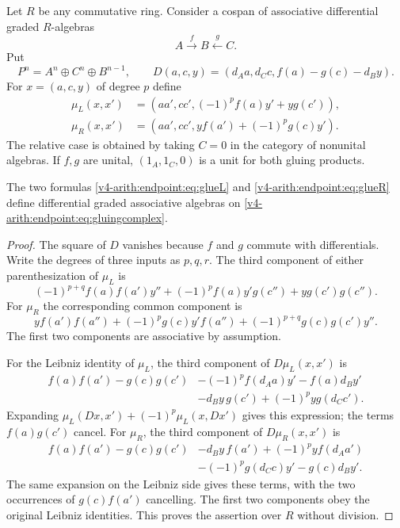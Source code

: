 Let $R$ be any commutative ring. Consider a cospan of associative
differential graded $R$-algebras
\[
 A\xrightarrow{\ f\ }B\xleftarrow{\ g\ }C.
\]
Put
\begin{equation}\label{v4-arith:endpoint:eq:gluingcomplex}
 P^n=A^n\oplus C^n\oplus B^{n-1},\qquad
 D(a,c,y)=(d_Aa,d_Cc,f(a)-g(c)-d_By).
\end{equation}
For $x=(a,c,y)$ of degree $p$ define
\begin{align}
 \mu_L(x,x')&=(aa',cc',(-1)^p f(a)y'+y g(c')),\label{v4-arith:endpoint:eq:glueL}\\
 \mu_R(x,x')&=(aa',cc',y f(a')+(-1)^p g(c)y').\label{v4-arith:endpoint:eq:glueR}
\end{align}
The relative case is obtained by taking $C=0$ in the category of nonunital algebras. If $f,g$ are unital, $(1_A,1_C,0)$ is a unit for both gluing products.

\begin{lemma}\label{v4-arith:endpoint:lem:dg}
The two formulas \eqref{v4-arith:endpoint:eq:glueL} and \eqref{v4-arith:endpoint:eq:glueR} define differential graded associative algebras on \eqref{v4-arith:endpoint:eq:gluingcomplex}.
\end{lemma}
\begin{proof}
The square of $D$ vanishes because $f$ and $g$ commute with differentials. Write the degrees of three inputs as $p,q,r$. The third component of either parenthesization of $\mu_L$ is
\[
 (-1)^{p+q}f(a)f(a')y''+
 (-1)^p f(a)y'g(c'')+y g(c')g(c'').
\]
For $\mu_R$ the corresponding common component is
\[
 y f(a')f(a'')+(-1)^p g(c)y'f(a'')
       +(-1)^{p+q}g(c)g(c')y''.
\]
The first two components are associative by assumption.

For the Leibniz identity of $\mu_L$, the third component of $D\mu_L(x,x')$ is
\begin{align*}
 f(a)f(a')-g(c)g(c')
 &-(-1)^p f(d_Aa)y'-f(a)d_By'\\
 &-d_By\,g(c')+(-1)^p y g(d_Cc').
\end{align*}
Expanding $\mu_L(Dx,x')+(-1)^p\mu_L(x,Dx')$ gives this expression; the terms $f(a)g(c')$ cancel. For $\mu_R$, the third component of $D\mu_R(x,x')$ is
\begin{align*}
 f(a)f(a')-g(c)g(c')
 &-d_By\,f(a')+(-1)^p y f(d_Aa')\\
 &-(-1)^p g(d_Cc)y'-g(c)d_By'.
\end{align*}
The same expansion on the Leibniz side gives these terms, with the two occurrences of $g(c)f(a')$ cancelling. The first two components obey the original Leibniz identities. This proves the assertion over $R$ without division.
\end{proof}

